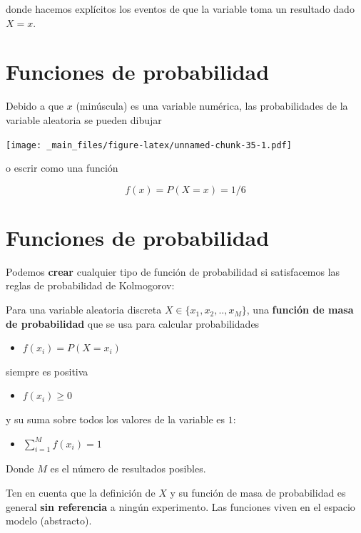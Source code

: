 \documentclass[
]{book}
\providecommand{\tightlist}{%
  \setlength{\itemsep}{0pt}\setlength{\parskip}{0pt}}
\begin{document}
donde hacemos explícitos los eventos de que la variable toma un resultado dado \(X=x\).

\hypertarget{funciones-de-probabilidad}{%
\section{Funciones de probabilidad}\label{funciones-de-probabilidad}}

Debido a que \(x\) (minúscula) es una variable numérica, las probabilidades de la variable aleatoria se pueden dibujar

\texttt{[image: \_main\_files/figure-latex/unnamed-chunk-35-1.pdf]}

o escrir como una función

\[f(x)=P(X=x)=1/6\]

\hypertarget{funciones-de-probabilidad-1}{%
\section{Funciones de probabilidad}\label{funciones-de-probabilidad-1}}

Podemos \textbf{crear} cualquier tipo de función de probabilidad si satisfacemos las reglas de probabilidad de Kolmogorov:

Para una variable aleatoria discreta \(X \in \{x_1 , x_2 , .. , x_M\}\), una \textbf{función de masa de probabilidad} que se usa para calcular probabilidades

\begin{itemize}
\tightlist
\item
  \(f(x_i)=P(X=x_i)\)
\end{itemize}

siempre es positiva

\begin{itemize}
\tightlist
\item
  \(f(x_i)\geq 0\)
\end{itemize}

y su suma sobre todos los valores de la variable es \(1\):

\begin{itemize}
\tightlist
\item
  \(\sum_{i=1}^M f(x_i)=1\)
\end{itemize}

Donde \(M\) es el número de resultados posibles.

Ten en cuenta que la definición de \(X\) y su función de masa de probabilidad es general \textbf{sin referencia} a ningún experimento. Las funciones viven en el espacio modelo (abstracto).
\end{document}
